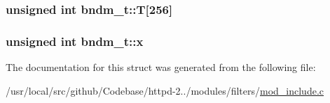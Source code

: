 \subsubsection[{\texorpdfstring{T}{T}}]{\setlength{\rightskip}{0pt plus 5cm}unsigned {\bf int} bndm\+\_\+t\+::T\mbox{[}256\mbox{]}}\hypertarget{structbndm__t_ad6e7098b82cda15268b0ec1caa1f9b39}{}\label{structbndm__t_ad6e7098b82cda15268b0ec1caa1f9b39}
\subsubsection[{\texorpdfstring{x}{x}}]{\setlength{\rightskip}{0pt plus 5cm}unsigned {\bf int} bndm\+\_\+t\+::x}\hypertarget{structbndm__t_a5bef6339de69199e3f1369638062fe92}{}\label{structbndm__t_a5bef6339de69199e3f1369638062fe92}


The documentation for this struct was generated from the following file\+:\begin{DoxyCompactItemize}
\item 
/usr/local/src/github/\+Codebase/httpd-\/2../modules/filters/\hyperlink{mod__include_8c}{mod\+\_\+include.\+c}\end{DoxyCompactItemize}
